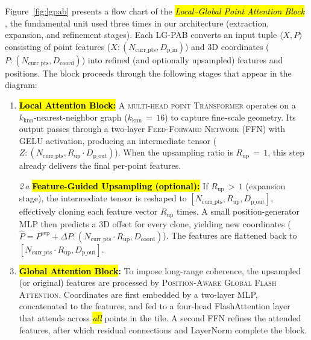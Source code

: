 \documentclass[remotesensing,article,accept,pdftex,moreauthors]{Definitions/mdpi}
\begin{document}


Figure~\ref{fig:lgpab} presents a flow chart of the \emph{\hl{Local–Global Point Attention Block}%
}, the fundamental unit used three times in our architecture (extraction, expansion, and refinement stages). Each LG-PAB converts an input tuple $\langle X, P \rangle$ consisting of point features ($X: (N_{\text{curr\_pts}}, D_{\text{p\_in}})$) and 3D coordinates ($P: (N_{\text{curr\_pts}}, D_{\text{coord}})$) into refined (and optionally upsampled) features and positions. The block proceeds through the following stages that appear in the diagram:

\begin{enumerate}[leftmargin=*]
\item \textbf{\hl{Local Attention Block:}}
      A %
      \textsc{multi-head point Transformer} operates on a $k_{\text{knn}}$-nearest-neighbor graph ($k_{\text{knn}}\,{=}\,16$) to capture fine-scale geometry. Its output passes through a two-layer \textsc{Feed-Forward Network} (FFN) with GELU activation, producing an intermediate tensor
      ($Z: (N_{\text{curr\_pts}}, R_{\text{up}} \cdot D_{\text{p\_out}})$). When the upsampling ratio is $R_{\text{up}}\,{=}\,1$, this step already delivers the final per-point features.

\item[\emph{2\,a}] \textbf{\hl{Feature-Guided Upsampling (optional):} %
}
      If $R_{\text{up}}\,{>}\,1$ (expansion stage), the intermediate tensor is reshaped to $[N_{\text{curr\_pts}}, R_{\text{up}}, D_{\text{p\_out}}]$, effectively cloning each feature vector $R_{\text{up}}$ times.
      A small position-generator MLP then predicts a 3D offset for every clone, yielding new coordinates
      ($\hat{P} = P^{\text{rep}} + \Delta P: (N_{\text{curr\_pts}} \cdot R_{\text{up}}, D_{\text{coord}})$).
      The features are flattened back to $[N_{\text{curr\_pts}} \cdot R_{\text{up}}, D_{\text{p\_out}}]$.

\item \textbf{\hl{Global Attention Block}:}
      To impose long-range coherence, the upsampled (or original) features are processed by %
      \textsc{Position-Aware Global Flash Attention}. Coordinates are first embedded by a two-layer MLP, concatenated to the features, and fed to a four-head FlashAttention layer that attends across \emph{\hl{all}} points in the tile. A second FFN refines the attended features, after which residual connections and LayerNorm complete the block.
\end{enumerate}
\end{document}
